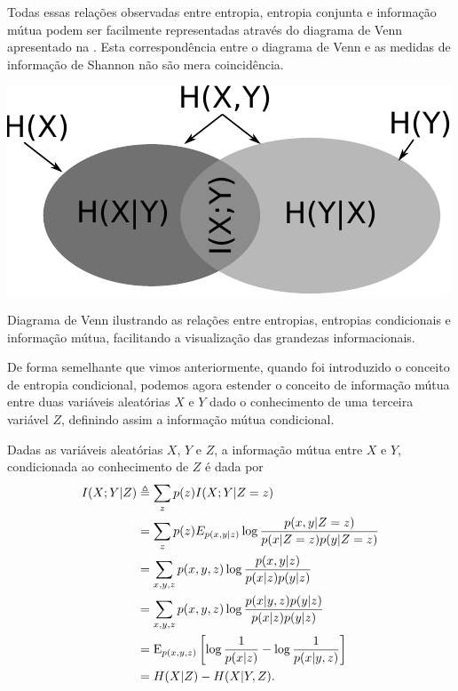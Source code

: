 Todas essas relações observadas entre entropia, entropia conjunta e informação mútua
podem ser facilmente representadas através do diagrama de Venn apresentado na .
Esta correspondência entre o diagrama de Venn e as medidas de informação
de Shannon não são mera coincidência.
\begin{marginfigure}%
  \includegraphics[width=\linewidth]{figures/info-set.pdf}
  \caption{Diagrama de Venn ilustrando as relações entre entropias, entropias condicionais e informação mútua, facilitando a visualização das grandezas informacionais.}
  \label{fig:vennshannon}
\end{marginfigure}

De forma semelhante que vimos anteriormente, quando foi introduzido
o conceito de entropia condicional, podemos agora estender o conceito
de informação mútua entre duas variáveis aleatórias $X$ e $Y$ dado o 
conhecimento de uma terceira variável $Z$, definindo assim a informação 
mútua condicional.
\begin{definition}\label{def:infmutcond}
Dadas as variáveis aleatórias $X$, $Y$ e $Z$, a informação mútua entre
$X$ e $Y$, condicionada ao conhecimento de $Z$ é dada por
\begin{subequations}\label{eq:mutinfcond}
{
\allowdisplaybreaks
\begin{align}
I(X;Y|Z) &\triangleq \sum_z p(z) I(X;Y|Z=z) \\
         &= \sum_z p(z) E_{p(x,y|z)} \log \frac{p(x,y|Z=z)}{p(x|Z=z) p(y|Z=z)} \\
         &= \sum_{x,y,z} p(x,y,z) \log \frac{p(x,y|z)}{p(x|z)p(y|z)} \\
	 &= \sum_{x,y,z} p(x,y,z) \log \frac{p(x|y,z)p(y|z)}{p(x|z)p(y|z)} \\
	 &= \E_{p(x,y,z)} \left[ \log \frac{1}{p(x|z)} - \log \frac{1}{p(x|y,z)} \right] \\
         &= H(X|Z) - H(X|Y,Z) .
\end{align}
}
\end{subequations}
\end{definition}





